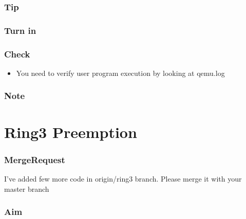 \documentclass[]{book}
\newenvironment{Shaded}{}{}
\newcommand{\KeywordTok}[1]{\textbf{{#1}}}
\newcommand{\NormalTok}[1]{{#1}}
\begin{document}
\subsubsection*{Tip}\label{tip-9}

\subsubsection*{Turn in}\label{turn-in-9}

\subsubsection*{Check}\label{check-9}

\begin{itemize}
\itemsep1pt\parskip0pt
\item
  You need to verify user program execution by looking at qemu.log
\end{itemize}

\subsubsection*{Note}\label{note-11}

\section{Ring3 Preemption}\label{ring3-preemption}

\subsubsection*{MergeRequest}\label{mergerequest-10}

I've added few more code in origin/ring3 branch. Please merge it with
your master branch

\begin{Shaded}
\end{Shaded}

\subsubsection*{Aim}\label{aim-10}
\end{document}
